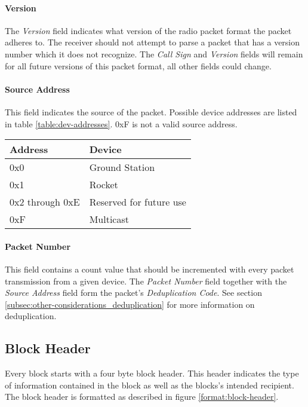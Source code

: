 \paragraph{Version}
The \emph{Version} field indicates what version of the radio packet format the packet adheres to. The receiver should
not attempt to parse a packet that has a version number which it does not recognize. The \emph{Call Sign} and
\emph{Version} fields will remain for all future versions of this packet format, all other fields could change.

\paragraph{Source Address}
This field indicates the source of the packet. Possible device addresses are listed in table \ref{table:dev-addresses}.
0xF is not a valid source address.

\begin{table*}
    \centering
    \begin{tabular}{@{}ll@{}}
        \toprule
        Address         & Device                  \\
        \midrule
        0x0             & Ground Station          \\
        0x1             & Rocket                  \\
        0x2 through 0xE & Reserved for future use \\
        0xF             & Multicast               \\
        \bottomrule
    \end{tabular}
    \caption{Device addresses}
    \label{table:dev-addresses}
\end{table*}

\paragraph{Packet Number}
This field contains a count value that should be incremented with every packet transmission from a given device. The
\emph{Packet Number} field together with the \emph{Source Address} field form the packet's \emph{Deduplication Code}.
See section \ref{subsec:other-considerations_deduplication} for more information on deduplication.

\subsection{Block Header}
Every block starts with a four byte block header. This header indicates the type of information contained in the block
as well as the blocks’s intended recipient. The block header is formatted as described in figure
\ref{format:block-header}.

